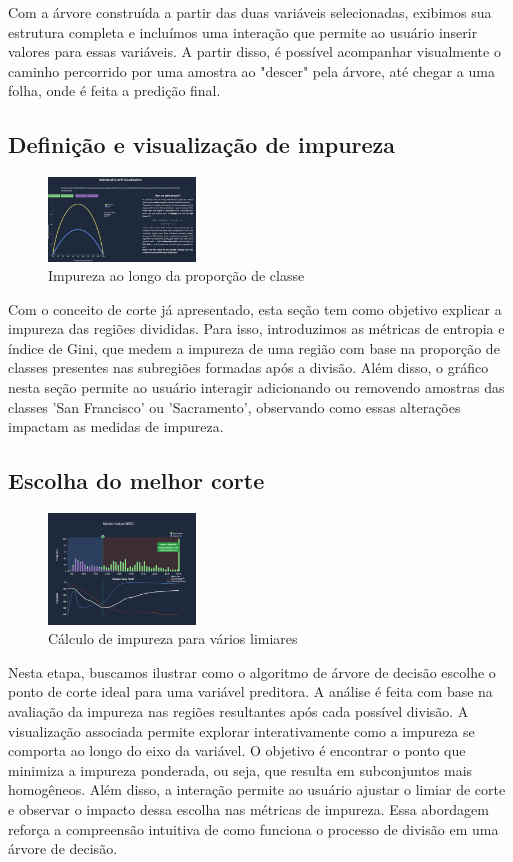 \documentclass[conference]{IEEEtran}
\begin{document}
    Com a árvore construída a partir das duas variáveis selecionadas, exibimos sua estrutura completa e incluímos uma interação que permite ao usuário inserir valores para essas variáveis. A partir disso, é possível acompanhar visualmente o caminho percorrido por uma amostra ao "descer" pela árvore, até chegar a uma folha, onde é feita a predição final.
\subsection{Definição e visualização de impureza}
\begin{figure}[h]
    \centering
    \includegraphics[width=0.35\textwidth]{gini.png}
    \caption{Impureza ao longo da proporção de classe}
    \label{fig:minha_imagem}
\end{figure}
    Com o conceito de corte já apresentado, esta seção tem como objetivo explicar a impureza das regiões divididas. Para isso, introduzimos as métricas de entropia e índice de Gini, que medem a impureza de uma região com base na proporção de classes presentes nas subregiões formadas após a divisão. Além disso, o gráfico nesta seção permite ao usuário interagir adicionando ou removendo amostras das classes 'San Francisco' ou 'Sacramento', observando como essas alterações impactam as medidas de impureza.

    
\subsection{Escolha do melhor corte}

\begin{figure}[h]
    \centering
    \includegraphics[width=0.35\textwidth]{unicut.png}
    \caption{Cálculo de impureza para vários limiares}
    \label{fig:minha_imagem}
\end{figure}
   Nesta etapa, buscamos ilustrar como o algoritmo de árvore de decisão escolhe o ponto de corte ideal para uma variável preditora. A análise é feita com base na avaliação da impureza nas regiões resultantes após cada possível divisão.
    A visualização associada permite explorar interativamente como a impureza se comporta ao longo do eixo da variável. O objetivo é encontrar o ponto que minimiza a impureza ponderada, ou seja, que resulta em subconjuntos mais homogêneos. Além disso, a interação permite ao usuário ajustar o limiar de corte e observar o impacto dessa escolha nas métricas de impureza.
    Essa abordagem reforça a compreensão intuitiva de como funciona o processo de divisão em uma árvore de decisão.
\end{document}
